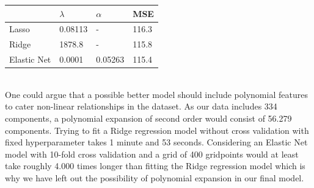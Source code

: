 \documentclass[12pt,a4paper]{article}
\begin{document}
\begin{table}[h!]
	\begin{tabular}{l|l|l|l}
			& $\lambda$ & $\alpha$ & MSE\\ \hline 
		Lasso&  0.08113& - &116.3  \\
		Ridge&  1878.8& -  & 115.8 \\
		Elastic Net& 0.0001 & 0.05263 & 115.4 
	\end{tabular}
\end{table}
\\
One could argue that a possible better model should include polynomial features to cater non-linear relationships in the dataset. As our data includes 334 components, a polynomial expansion of second order would consist of 56.279 components. Trying to fit a Ridge regression model without cross validation with fixed hyperparameter takes 1 minute and 53 seconds. Considering an Elastic Net model with 10-fold cross validation and a grid of 400 gridpoints would at least take roughly 4.000 times longer than fitting the Ridge regression model which is why we have left out the possibility of polynomial expansion in our final model.
\end{document}
